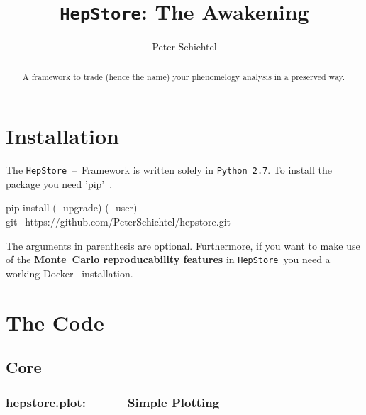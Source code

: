 \documentclass[aps,prd,11pt,tightenlines,superscriptaddress,nofootinbib,preprintnumbers,notitlepage]{revtex4-1}
\newcommand{\hepstore}{\texttt{HepStore}}
\newcommand{\python}{\texttt{Python~2.7}}
\begin{document}
\title{{\bf\Huge\hepstore: The Awakening}}


\author{Peter Schichtel}


\begin{abstract}
  A framework to trade (hence the name) your phenomelogy analysis in a preserved way. 
\end{abstract}

\maketitle

\bigskip 
\bigskip 

\tableofcontents 

\newpage


\chapter{Installation}
\label{ch:installation}

The \hepstore~--~Framework is written solely in \python. To install
the package you need 'pip'~\cite{}.
%
\begin{framed}
  \begin{center}
    pip install (-{}-upgrade) (-{}-user) git+https://github.com/PeterSchichtel/hepstore.git
  \end{center}
\end{framed}
%
The arguments in parenthesis are optional. Furthermore, if you want to
make use of the {\bf Monte~Carlo reproducability features} in
\hepstore~you need a working Docker~\cite{} installation.

\chapter{The Code}

\section{Core}
\label{sec:framework}



\subsection{hepstore.plot:~~~~~~\,Simple Plotting}
\end{document}
